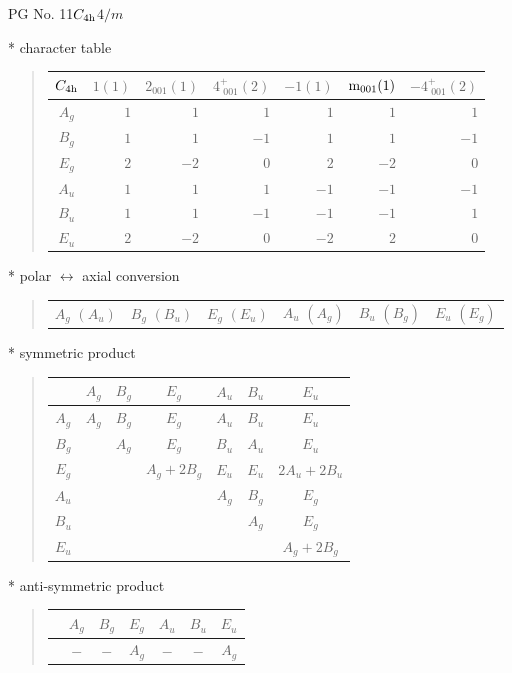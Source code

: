 \documentclass[fleqn,8pt,landscape]{jsarticle}
\begin{document}
\setcounter{MaxMatrixCols}{32}

\renewcommand{\tablename}{Table~}
\renewcommand{\figurename}{Figure~}
\begin{center}
\LARGE
PG No. 11\quad$C_{\rm 4h}$\quad$4/m$\quad[ tetragonal ]
\end{center}

* character table
\begin{quote}
\begin{tabular}{crrrrrr} \hline \hline
$ C_{\rm 4h} $ & $ 1(1) $ & $ 2{}_{001}(1) $ & $ 4^{+}_{\,\,001}(2) $ & $ -1(1) $ & $ {\rm m}_{001}(1) $ & $ -4^{+}_{\,\,001}(2) $ \\ \hline
$ A_{g} $ & $ 1 $ & $ 1 $ & $ 1 $ & $ 1 $ & $ 1 $ & $ 1 $ \\
$ B_{g} $ & $ 1 $ & $ 1 $ & $ -1 $ & $ 1 $ & $ 1 $ & $ -1 $ \\
$ E_{g} $ & $ 2 $ & $ -2 $ & $ 0 $ & $ 2 $ & $ -2 $ & $ 0 $ \\
$ A_{u} $ & $ 1 $ & $ 1 $ & $ 1 $ & $ -1 $ & $ -1 $ & $ -1 $ \\
$ B_{u} $ & $ 1 $ & $ 1 $ & $ -1 $ & $ -1 $ & $ -1 $ & $ 1 $ \\
$ E_{u} $ & $ 2 $ & $ -2 $ & $ 0 $ & $ -2 $ & $ 2 $ & $ 0 $ \\
 \hline \hline
\end{tabular}
\end{quote}

* polar $\leftrightarrow$ axial conversion
\begin{quote}
\begin{tabular}{cccccc}
$ A_{g}\,\,(A_{u}) $ & $ B_{g}\,\,(B_{u}) $ & $ E_{g}\,\,(E_{u}) $ & $ A_{u}\,\,(A_{g}) $ & $ B_{u}\,\,(B_{g}) $ & $ E_{u}\,\,(E_{g}) $
\end{tabular}
\end{quote}

* symmetric product
\begin{quote}
\begin{tabular}{c|cccccc} \hline \hline
 & $ A_{g} $ & $ B_{g} $ & $ E_{g} $ & $ A_{u} $ & $ B_{u} $ & $ E_{u} $ \\ \hline
$ A_{g} $ & $ A_{g} $ & $ B_{g} $ & $ E_{g} $ & $ A_{u} $ & $ B_{u} $ & $ E_{u} $ \\
$ B_{g} $ & $  $ & $ A_{g} $ & $ E_{g} $ & $ B_{u} $ & $ A_{u} $ & $ E_{u} $ \\
$ E_{g} $ & $  $ & $  $ & $ A_{g} + 2 B_{g} $ & $ E_{u} $ & $ E_{u} $ & $ 2 A_{u} + 2 B_{u} $ \\
$ A_{u} $ & $  $ & $  $ & $  $ & $ A_{g} $ & $ B_{g} $ & $ E_{g} $ \\
$ B_{u} $ & $  $ & $  $ & $  $ & $  $ & $ A_{g} $ & $ E_{g} $ \\
$ E_{u} $ & $  $ & $  $ & $  $ & $  $ & $  $ & $ A_{g} + 2 B_{g} $ \\
 \hline \hline
\end{tabular}
\end{quote}

* anti-symmetric product
\begin{quote}
\begin{tabular}{ccccccc} \hline \hline
 & $ A_{g} $ & $ B_{g} $ & $ E_{g} $ & $ A_{u} $ & $ B_{u} $ & $ E_{u} $ \\ \hline
$  $ & $ - $ & $ - $ & $ A_{g} $ & $ - $ & $ - $ & $ A_{g} $ \\
 \hline \hline
\end{tabular}
\end{quote}
\end{document}
